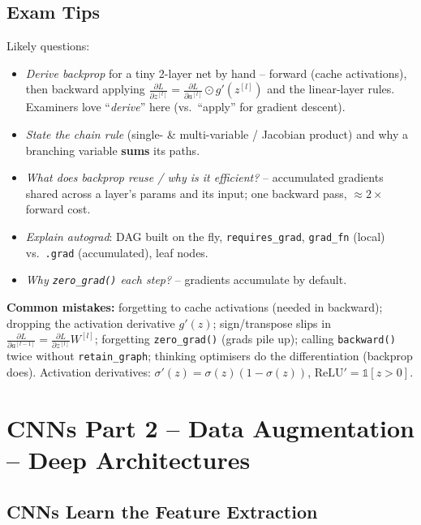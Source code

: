\documentclass[10pt,a4paper]{article}
\begin{document}
	\subsection{Exam Tips}

	\begin{examtipbox}
		Likely questions:
		\begin{itemize}[leftmargin=*]
			\item \emph{Derive backprop} for a tiny 2-layer net by hand -- forward (cache activations), then backward applying $\frac{\partial L}{\partial z^{[l]}}=\frac{\partial L}{\partial a^{[l]}}\odot g'(z^{[l]})$ and the linear-layer rules. Examiners love ``\emph{derive}'' here (vs.\ ``apply'' for gradient descent).
			\item \emph{State the chain rule} (single- \& multi-variable / Jacobian product) and why a branching variable \textbf{sums} its paths.
			\item \emph{What does backprop reuse / why is it efficient?} -- accumulated gradients shared across a layer's params and its input; one backward pass, $\approx 2\times$ forward cost.
			\item \emph{Explain autograd}: DAG built on the fly, \texttt{requires\_grad}, \texttt{grad\_fn} (local) vs.\ \texttt{.grad} (accumulated), leaf nodes.
			\item \emph{Why \texttt{zero\_grad()} each step?} -- gradients accumulate by default.
		\end{itemize}
		\textbf{Common mistakes:} forgetting to cache activations (needed in backward); dropping the activation derivative $g'(z)$; sign/transpose slips in $\frac{\partial L}{\partial a^{[l-1]}}=\frac{\partial L}{\partial z^{[l]}}W^{[l]}$; forgetting \texttt{zero\_grad()} (grads pile up); calling \texttt{backward()} twice without \texttt{retain\_graph}; thinking optimisers do the differentiation (backprop does). Activation derivatives: $\sigma'(z)=\sigma(z)(1-\sigma(z))$, $\mathrm{ReLU}'=\mathbb{1}[z>0]$.
	\end{examtipbox}
	\section{CNNs Part 2 -- Data Augmentation -- Deep Architectures}

	\subsection{CNNs Learn the Feature Extraction}
\end{document}
